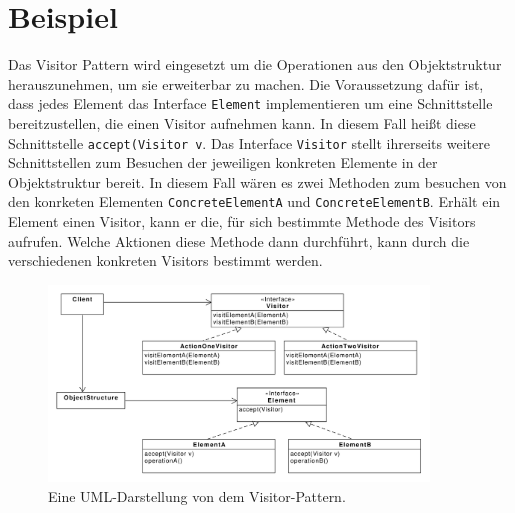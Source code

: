 \section{Beispiel}

Das Visitor Pattern wird eingesetzt um die Operationen aus den Objektstruktur herauszunehmen, um sie erweiterbar zu machen. Die Voraussetzung dafür ist, dass jedes  Element  das Interface \texttt{Element} implementieren um eine Schnittstelle bereitzustellen, die einen Visitor aufnehmen kann. In diesem Fall heißt diese Schnittstelle \texttt{accept(Visitor v}. Das Interface \texttt{Visitor} stellt ihrerseits weitere Schnittstellen zum Besuchen der jeweiligen konkreten Elemente in der Objektstruktur bereit. In diesem Fall wären es zwei Methoden zum besuchen von den konrketen Elementen \texttt{ConcreteElementA} und \texttt{ConcreteElementB}. 
Erhält ein Element einen Visitor, kann er die, für sich bestimmte Methode des Visitors aufrufen. Welche Aktionen diese Methode dann durchführt, kann durch die verschiedenen konkreten Visitors bestimmt werden.

\begin{figure}[htbp]
\centering
\includegraphics[width=0.9\textwidth]{./paper/visitor/visitor}
\caption{Eine UML-Darstellung von dem Visitor-Pattern.}
\label{observerdiagramm}
\end{figure} 
